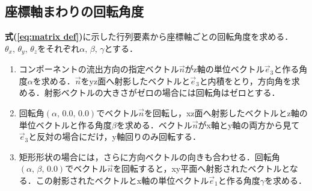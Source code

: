 \subsection{座標軸まわりの回転角度}
\textbf{式(\ref{eq:matrix def})}に示した行列要素から座標軸ごとの回転角度を求める．
$\theta_x,\,\theta_y,\,\theta_z$をそれぞれ$\alpha,\,\beta,\,\gamma$とする．

\begin{enumerate}
\item コンポーネントの流出方向の指定ベクトル$\overrightarrow{n}$がz軸の単位ベクトル$\overrightarrow{e}_3$と作る角度$\alpha$を求める．$\overrightarrow{n}$をyz面へ射影したベクトルと$\overrightarrow{e}_3$と内積をとり，方向角を求める．射影ベクトルの大きさがゼロの場合には回転角はゼロとする．
\item 回転角$(\alpha,\, 0.0,\, 0.0)$でベクトル$\overrightarrow{n}$を回転し，xz面へ射影したベクトルとz軸の単位ベクトルと作る角度$\beta$を求める．ベクトル$\overrightarrow{n}$がx軸とy軸の両方から見て$\overrightarrow{e}_3$と反対の場合にだけ，y軸回りのみ回転する．
\item 矩形形状の場合には，さらに方向ベクトルの向きも合わせる．回転角$(\alpha,\, \beta,\, 0.0)$でベクトル$\overrightarrow{n}$を回転すると，xy平面へ射影されたベクトルとなる．この射影されたベクトルとx軸の単位ベクトル$\overrightarrow{e}_1$と作る角度$\gamma$を求める．
\end{enumerate}





